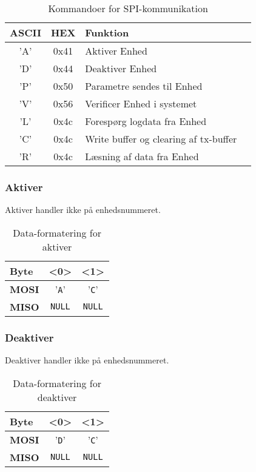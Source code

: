 \begin{table}[H]
\caption{Kommandoer for SPI-kommunikation}
\centering
\begin{tabular}{|c|c|l|c|}
\hline 
\textbf{ASCII} & \textbf{HEX} & \textbf{Funktion} \\ 
\hline 
'A' & 0x41 & Aktiver Enhed \\ 
\hline 
'D' & 0x44 & Deaktiver Enhed \\ 
\hline 
'P' & 0x50 & Parametre sendes til Enhed \\
\hline 
'V' & 0x56 & Verificer Enhed i systemet \\ 
\hline
'L' & 0x4c & Forespørg logdata fra Enhed \\ 
\hline
'C' & 0x4c & Write buffer og clearing af tx-buffer  \\
\hline
'R' & 0x4c & Læsning af data fra Enhed \\
\hline
\end{tabular}
\label{tabel:SWProtokol-kommandoer}
\end{table} 


\subsubsection{Aktiver}

Aktiver handler ikke på enhedsnummeret.

\begin{table}[H]
	\caption{Data-formatering for aktiver}
	\centering
	\begin{tabular}{|l|c|c|}
		\hline 
		\textbf{Byte} & \textbf{<0>} & \textbf{<1>} \\ 
		\hline 
		\textbf{MOSI} & '\verb+A+' & '\verb+C+'	\\ 
		\hline 
		\textbf{MISO} & \verb+NULL+ & \verb+NULL+ \\ 
		\hline 
	\end{tabular} 
	\label{table:SWProtokol-aktiver}
\end{table}

\subsubsection{Deaktiver}

Deaktiver handler ikke på enhedsnummeret.

\begin{table}[H]
	\caption{Data-formatering for deaktiver}
	\centering
	\begin{tabular}{|l|c|c|}
		\hline 
		\textbf{Byte} & \textbf{<0>} & \textbf{<1>} \\ 
		\hline 
		\textbf{MOSI} & '\verb+D+' & '\verb+C+'\\ 
		\hline 
		\textbf{MISO} & \verb+NULL+ & \verb+NULL+ \\ 
		\hline 
	\end{tabular} 
	\label{table:SWProtokol-deaktiver}
\end{table}

